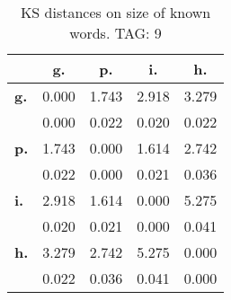 \begin{table}[h!]
\begin{center}
\begin{tabular}{| l || c | c | c | c |}\hline
 & {\bf g.} & {\bf p.} & {\bf i.} & {\bf h.} \\\hline\hline
{\bf g.} & 0.000 & 1.743 & 2.918 & 3.279 \\
{\bf } & 0.000 & 0.022 & 0.020 & 0.022 \\\hline
{\bf p.} & 1.743 & 0.000 & 1.614 & 2.742 \\
{\bf } & 0.022 & 0.000 & 0.021 & 0.036 \\\hline
{\bf i.} & 2.918 & 1.614 & 0.000 & 5.275 \\
{\bf } & 0.020 & 0.021 & 0.000 & 0.041 \\\hline
{\bf h.} & 3.279 & 2.742 & 5.275 & 0.000 \\
{\bf } & 0.022 & 0.036 & 0.041 & 0.000 \\\hline
\end{tabular}
\caption{KS distances on size of known words. TAG: 9}
\end{center}
\end{table}